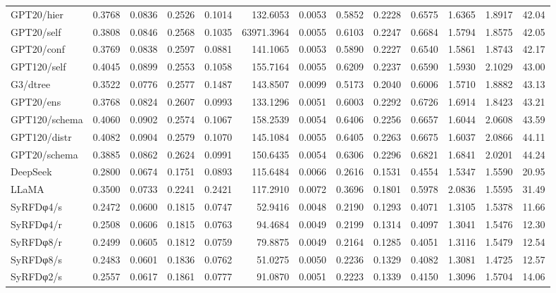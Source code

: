 \begin{table}[t]
\begin{tabular}{lrrrrrrrrrrrr}
GPT20/hier & 0.3768 & 0.0836 & 0.2526 & 0.1014 & 132.6053 & 0.0053 & 0.5852 & 0.2228 & 0.6575 & 1.6365 & 1.8917 & 42.04 \\
GPT20/self & 0.3808 & 0.0846 & 0.2568 & 0.1035 & 63971.3964 & 0.0055 & 0.6103 & 0.2247 & 0.6684 & 1.5794 & 1.8575 & 42.05 \\
GPT20/conf & 0.3769 & 0.0838 & 0.2597 & 0.0881 & 141.1065 & 0.0053 & 0.5890 & 0.2227 & 0.6540 & 1.5861 & 1.8743 & 42.17 \\
GPT120/self & 0.4045 & 0.0899 & 0.2553 & 0.1058 & 155.7164 & 0.0055 & 0.6209 & 0.2237 & 0.6590 & 1.5930 & 2.1029 & 43.00 \\
G3/dtree & 0.3522 & 0.0776 & 0.2577 & 0.1487 & 143.8507 & 0.0099 & 0.5173 & 0.2040 & 0.6006 & 1.5710 & 1.8882 & 43.13 \\
GPT20/ens & 0.3768 & 0.0824 & 0.2607 & 0.0993 & 133.1296 & 0.0051 & 0.6003 & 0.2292 & 0.6726 & 1.6914 & 1.8423 & 43.21 \\
GPT120/schema & 0.4060 & 0.0902 & 0.2574 & 0.1067 & 158.2539 & 0.0054 & 0.6406 & 0.2256 & 0.6657 & 1.6044 & 2.0608 & 43.59 \\
GPT120/distr & 0.4082 & 0.0904 & 0.2579 & 0.1070 & 145.1084 & 0.0055 & 0.6405 & 0.2263 & 0.6675 & 1.6037 & 2.0866 & 44.11 \\
GPT20/schema & 0.3885 & 0.0862 & 0.2624 & 0.0991 & 150.6435 & 0.0054 & 0.6306 & 0.2296 & 0.6821 & 1.6841 & 2.0201 & 44.24 \\
\midrule
DeepSeek & 0.2800 & 0.0674 & 0.1751 & 0.0893 & 115.6484 & 0.0066 & 0.2616 & 0.1531 & 0.4554 & 1.5347 & 1.5590 & 20.95 \\
LLaMA & 0.3500 & 0.0733 & 0.2241 & 0.2421 & 117.2910 & 0.0072 & 0.3696 & 0.1801 & 0.5978 & 2.0836 & 1.5595 & 31.49 \\
\midrule
SyRFDφ4/s & 0.2472 & 0.0600 & 0.1815 & 0.0747 & 52.9416 & 0.0048 & 0.2190 & 0.1293 & 0.4071 & 1.3105 & 1.5378 & 11.66 \\
SyRFDφ4/r & 0.2508 & 0.0606 & 0.1815 & 0.0763 & 94.4684 & 0.0049 & 0.2199 & 0.1314 & 0.4097 & 1.3041 & 1.5476 & 12.30 \\
SyRFDφ8/r & 0.2499 & 0.0605 & 0.1812 & 0.0759 & 79.8875 & 0.0049 & 0.2164 & 0.1285 & 0.4051 & 1.3116 & 1.5479 & 12.54 \\
SyRFDφ8/s & 0.2483 & 0.0601 & 0.1836 & 0.0762 & 51.0275 & 0.0050 & 0.2236 & 0.1329 & 0.4082 & 1.3081 & 1.4725 & 12.57 \\
SyRFDφ2/s & 0.2557 & 0.0617 & 0.1861 & 0.0777 & 91.0870 & 0.0051 & 0.2223 & 0.1339 & 0.4150 & 1.3096 & 1.5704 & 14.06 \\

\end{tabular}
\end{table}
